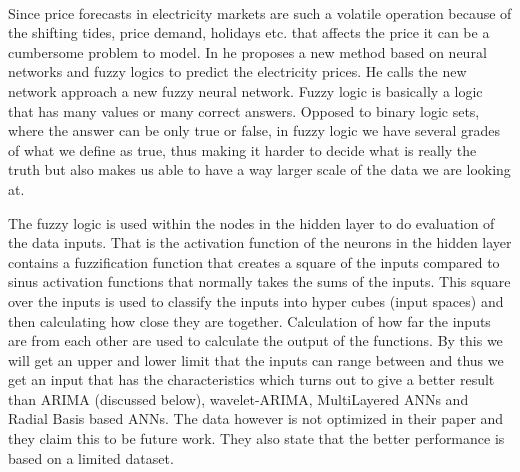 \\[0.5cm]
Since price forecasts in electricity markets are such a volatile operation because of the shifting tides, price demand, holidays etc. that affects the price it can be a cumbersome problem to model. In \cite{amjady2006day} he proposes a new method based on neural networks and fuzzy logics to predict the electricity prices. He calls the new network approach a new fuzzy neural network. Fuzzy logic is basically a logic that has many values or many correct answers. Opposed to binary logic sets, where the answer can be only true or false, in fuzzy logic we have several grades of what we define as true, thus making it harder to decide what is really the truth but also makes us able to have a way larger scale of the data we are looking at.

The fuzzy logic is used within the nodes in the hidden layer to do evaluation of the data inputs. That is the activation function of the neurons in the hidden layer contains a fuzzification function that creates a square of the inputs compared to sinus activation functions that normally takes the sums of the inputs. This square over the inputs is used to classify the inputs into hyper cubes (input spaces) and then calculating how close they are together. Calculation of how far the inputs are from each other are used to calculate the output of the functions. By this we will get an upper and lower limit that the inputs can range between and thus we get an input that has the characteristics which turns out to give a better result than ARIMA (discussed below), wavelet-ARIMA, MultiLayered ANNs and Radial Basis based ANNs. The data however is not optimized in their paper and they claim this to be future work. They also state that the better performance is based on a limited dataset.